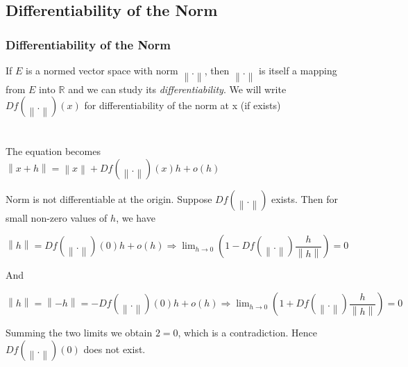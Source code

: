 \documentclass{beamer}
\newcommand{\R}{\mathbb{R}}
\newcommand\norm[1]{\left\lVert#1\right\rVert}
\begin{document}
\subsection{Differentiability of the Norm}


\begin{frame} %
\frametitle{Differentiability of the Norm}

If $E$ is a normed vector space with norm $\norm{.}$, then $\norm{.}$ is itself a mapping from $E$ into $\R$ and we can study its \textit{differentiability}. We will write $Df(\norm{.}) (x)$ for differentiability of the norm at x (if exists) \\~\\~\\
\pause
The equation becomes \\

$\norm{x + h} = \norm{x} + Df(\norm{.})(x)h + o(h) $


\end{frame}

\begin{frame}
\begin{block}{Norm is not differentiable at the origin.}
Suppose $Df(\norm{.})$ exists. Then for small non-zero values of $h$, we have \\
\begin{center}
$ \norm{h} =  Df(\norm{.})(0)h + o(h) \Rightarrow \lim_{h \to 0} \left( 1 - Df(\norm{.}) \dfrac{h}{\norm{h}} \right) = 0 $
\end{center} And
\begin{center}
$ \norm{h} = \norm{-h} =  -Df(\norm{.})(0)h + o(h) \Rightarrow \lim_{h \to 0} \left( 1 + Df(\norm{.}) \dfrac{h}{\norm{h}} \right) = 0$
\end{center}

Summing the two limits we obtain $2=0$, which is a contradiction. Hence $ Df(\norm{.})(0)$ does not exist.\\~\\

\end{block}


\end{frame}
\end{document}
